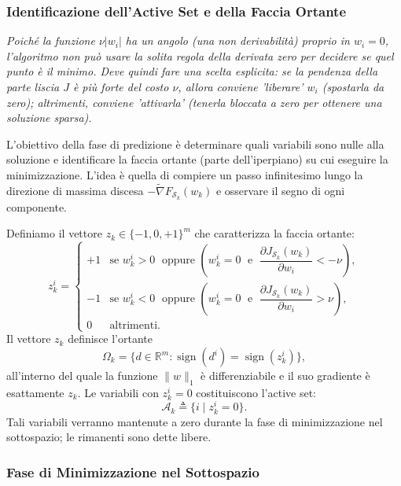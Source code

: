 \documentclass[a4paper,12pt]{article}
\begin{document}
\subsubsection{Identificazione dell'Active Set e della Faccia Ortante}
\textit{Poiché la funzione \(\nu|w_i|\) ha un angolo (una non derivabilità) proprio in \(w_i = 0\), l'algoritmo non può usare la solita regola della derivata zero per decidere se quel punto è il minimo. Deve quindi fare una scelta esplicita: se la pendenza della parte liscia \(J\) è più forte del costo \(\nu\), allora conviene 'liberare' \(w_i\) (spostarla da zero); altrimenti, conviene 'attivarla' (tenerla bloccata a zero per ottenere una soluzione sparsa).}

L'obiettivo della fase di predizione è determinare quali variabili sono nulle
alla soluzione e identificare la faccia ortante (parte dell'iperpiano) su cui eseguire la
minimizzazione. L'idea è quella di compiere un passo infinitesimo lungo la
direzione di massima discesa $-\widetilde{\nabla}F_{\mathcal{S}_k}(w_k)$ e
osservare il segno di ogni componente.

Definiamo il vettore $z_k \in \{-1,0,+1\}^m$ che caratterizza la faccia ortante:
\begin{equation}
z_k^i =
\begin{cases}
+1 & \text{se } w_k^i > 0 \;\text{ oppure } \left( w_k^i = 0 \;\text{ e }\; \dfrac{\partial J_{\mathcal{S}_k}(w_k)}{\partial w_i} < -\nu \right), \\[12pt]
-1 & \text{se } w_k^i < 0 \;\text{ oppure } \left( w_k^i = 0 \;\text{ e }\; \dfrac{\partial J_{\mathcal{S}_k}(w_k)}{\partial w_i} > \nu \right), \\[12pt]
0 & \text{altrimenti}.
\end{cases} \tag{6.4}
\end{equation}
Il vettore $z_k$ definisce l'ortante
\[
\Omega_k = \{ d \in \mathbb{R}^m : \operatorname{sign}(d^i) = \operatorname{sign}(z_k^i) \}, \tag{6.5}
\]
all'interno del quale la funzione $\|w\|_1$ è differenziabile e il suo gradiente
è esattamente $z_k$. Le variabili con $z_k^i = 0$ costituiscono l'active
set:
\begin{equation}
\mathcal{A}_k \triangleq \{ i \mid z_k^i = 0 \}. \tag{6.6}
\end{equation}
Tali variabili verranno mantenute a zero durante la fase di minimizzazione nel
sottospazio; le rimanenti sono dette libere.


\subsubsection{Fase di Minimizzazione nel Sottospazio}
\end{document}
